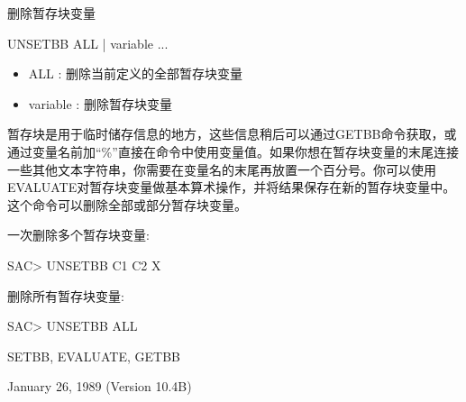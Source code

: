 \label{cmd:unsetbb}

删除暂存块变量

UNSETBB ALL | variable ...

\begin{itemize}
\item ALL : 删除当前定义的全部暂存块变量 
\item variable : 删除暂存块变量 
\end{itemize}

暂存块是用于临时储存信息的地方，这些信息稍后可以通过GETBB命令获取，或通过变量名前加``\%''直接在命令中使用变量值。如果你想在暂存块变量的末尾连接一些其他文本字符串，你需要在变量名的末尾再放置一个百分号。你可以使用EVALUATE对暂存块变量做基本算术操作，并将结果保存在新的暂存块变量中。这个命令可以删除全部或部分暂存块变量。

一次删除多个暂存块变量:
\begin{SACCode}
SAC> UNSETBB C1 C2 X
\end{SACCode}

删除所有暂存块变量:
\begin{SACCode}
SAC> UNSETBB ALL
\end{SACCode}

SETBB, EVALUATE, GETBB

January 26, 1989 (Version 10.4B)
